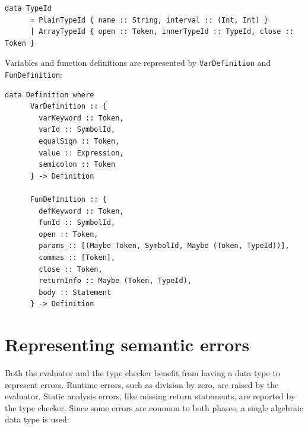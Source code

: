 \documentclass[UdineBachThesis,american,11pt]{PhdThesis}
\begin{document}
  \begin{Verbatim}[gobble=4,fontsize=\small]
    data TypeId
      = PlainTypeId { name :: String, interval :: (Int, Int) }
      | ArrayTypeId { open :: Token, innerTypeId :: TypeId, close :: Token }
  \end{Verbatim}

  Variables and function definitions are represented by
  \mbox{\texttt{VarDefinition}} and \mbox{\texttt{FunDefinition}}:

  \begin{Verbatim}[gobble=4,fontsize=\small]
    data Definition where
      VarDefinition :: {
        varKeyword :: Token,
        varId :: SymbolId,
        equalSign :: Token,
        value :: Expression,
        semicolon :: Token
      } -> Definition

      FunDefinition :: {
        defKeyword :: Token,
        funId :: SymbolId,
        open :: Token,
        params :: [(Maybe Token, SymbolId, Maybe (Token, TypeId))],
        commas :: [Token],
        close :: Token,
        returnInfo :: Maybe (Token, TypeId),
        body :: Statement
      } -> Definition
  \end{Verbatim}

  \section{Representing semantic errors}

  Both the evaluator and the type checker benefit from having a data type to
  represent errors. Runtime errors, such as division by zero, are raised by the
  evaluator. Static analysis errors, like missing return statements, are
  reported by the type checker. Since some errors are common to both phases, a
  single algebraic data type is used:
\end{document}
